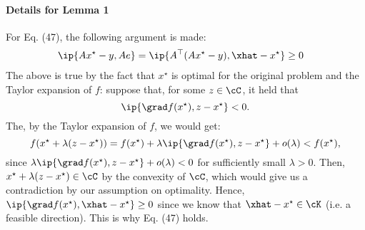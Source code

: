 \documentclass[a4paper]{article}
\newcommand{\xstar}{x^{\star}}
\begin{document}
\paragraph{Details for Lemma 1}
For Eq. (47), the following argument is made:
\begin{align*}
    \ip{A\xstar - y, Ae} &= \ip{A^\top (A\xstar - y), \xhat - \xstar} \geq 0
\end{align*}
The above is true by the fact that $\xstar$ is optimal for the
original problem and the Taylor expansion of $f$: suppose that, for some $z \in
\cC$, it held that
\[
    \ip{\grad f(\xstar), z - \xstar} < 0.
\]
The, by the Taylor expansion of $f$, we would get:
\[
    f(\xstar + \lambda (z - \xstar)) =
    f(\xstar) + \lambda \ip{\grad f(\xstar), z - \xstar} + o(\lambda)
    < f(\xstar),
\]
since $\lambda \ip{\grad f(\xstar), z - \xstar} + o(\lambda) < 0$ for
sufficiently small $\lambda > 0$. Then, $\xstar + \lambda (z - \xstar) \in \cC$
by the convexity of $\cC$, which would give us a contradiction by our assumption
on optimality. Hence, $\ip{\grad f(\xstar), \xhat - \xstar} \geq 0$ since we
know that $\xhat - \xstar \in \cK$ (i.e. a feasible direction).
This is why Eq. (47) holds.
\end{document}
